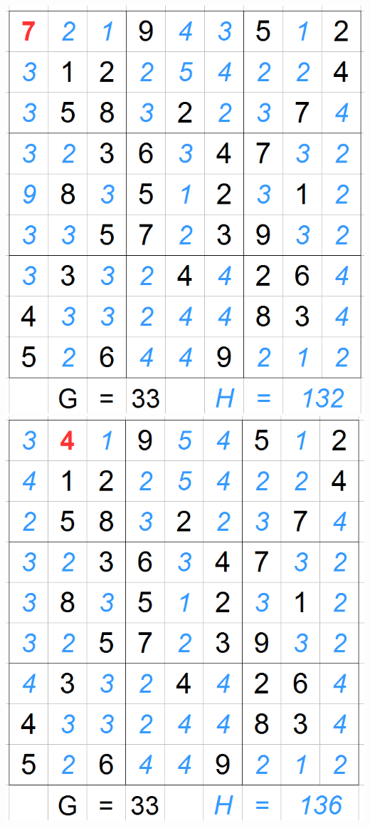 \begin{center}
\includegraphics[scale=0.3]{images/AStarExample/1_3.png} 
\includegraphics[scale=0.3]{images/AStarExample/1_4.png}
\end{center}

